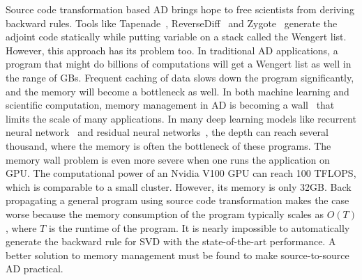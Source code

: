 \documentclass{article}
\newcommand{\<}{\langle}
\renewcommand{\>}{\rangle}
\theoremstyle{definition}\newtheorem{definition}{\textit{Definition}}
\begin{document}
    Source code transformation based AD brings hope to free scientists from deriving backward rules.
    Tools like Tapenade~\cite{Hascoet2013}, ReverseDiff~\cite{ReverseDiff} and Zygote~\cite{Innes2018, Innes2019} generate the adjoint code statically while putting variable on a stack called the Wengert list.
    However, this approach has its problem too. In traditional AD applications, a program that might do billions of computations will get a Wengert list as well in the range of GBs. Frequent caching of data slows down the program significantly, and the memory will become a bottleneck as well.
In both machine learning and scientific computation, memory management in AD is becoming a wall~\cite{Luo2019} that limits the scale of many applications.
In many deep learning models like recurrent neural network~\cite{Lipton2015} and residual neural networks~\cite{He2016}, the depth can reach several thousand, where the memory is often the bottleneck of these programs. The memory wall problem is even more severe when one runs the application on GPU. The computational power of an Nvidia V100 GPU can reach 100 TFLOPS, which is comparable to a small cluster. However, its memory is only 32GB.
Back propagating a general program using source code transformation makes the case worse because the memory consumption of the program typically scales as $O(T)$,
where $T$ is the runtime of the program. It is nearly impossible to automatically generate the backward rule for SVD with the state-of-the-art performance. A better solution to memory management must be found to make source-to-source AD practical.
\end{document}
